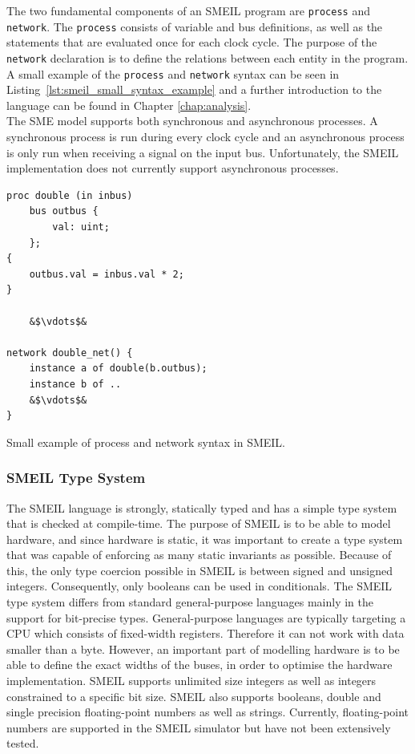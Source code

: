 The two fundamental components of an SMEIL program are \texttt{process} and \texttt{network}. The \texttt{process} consists of variable and bus definitions, as well as the statements that are evaluated once for each clock cycle. The purpose of the \texttt{network} declaration is to define the relations between each entity in the program. A small example of the \texttt{process} and \texttt{network} syntax can be seen in Listing~\ref{lst:smeil_small_syntax_example} and a further introduction to the language can be found in Chapter \ref{chap:analysis}.\\

The SME model supports both synchronous and asynchronous processes. A synchronous process is run during every clock cycle and an asynchronous process is only run when receiving a signal on the input bus. Unfortunately, the SMEIL implementation does not currently support asynchronous processes.
\begin{listing}
\begin{verbatim}
proc double (in inbus)
    bus outbus {
        val: uint;
    };
{
    outbus.val = inbus.val * 2;
}

    &$\vdots$&

network double_net() {
    instance a of double(b.outbus);
    instance b of ..
    &$\vdots$&
}
\end{verbatim}
\caption{Small example of process and network syntax in SMEIL.}
\label{lst:smeil_small_syntax_example}
\end{listing}
\subsubsection{SMEIL Type System}
The SMEIL language is strongly, statically typed and has a simple type system that is checked at compile-time. The purpose of SMEIL is to be able to model hardware, and since hardware is static, it was important to create a type system that was capable of enforcing as many static invariants as possible.
Because of this, the only type coercion possible in SMEIL is between signed and unsigned integers. Consequently, only booleans can be used in conditionals.
The SMEIL type system differs from standard general-purpose languages mainly in the support for bit-precise types. General-purpose languages are typically targeting a CPU which consists of fixed-width registers. Therefore it can not work with data smaller than a byte. However, an important part of modelling hardware is to be able to define the exact widths of the buses, in order to optimise the hardware implementation. SMEIL supports unlimited size integers as well as integers constrained to a specific bit size. SMEIL also supports booleans, double and single precision floating-point numbers as well as strings. Currently, floating-point numbers are supported in the SMEIL simulator but have not been extensively tested. \\

